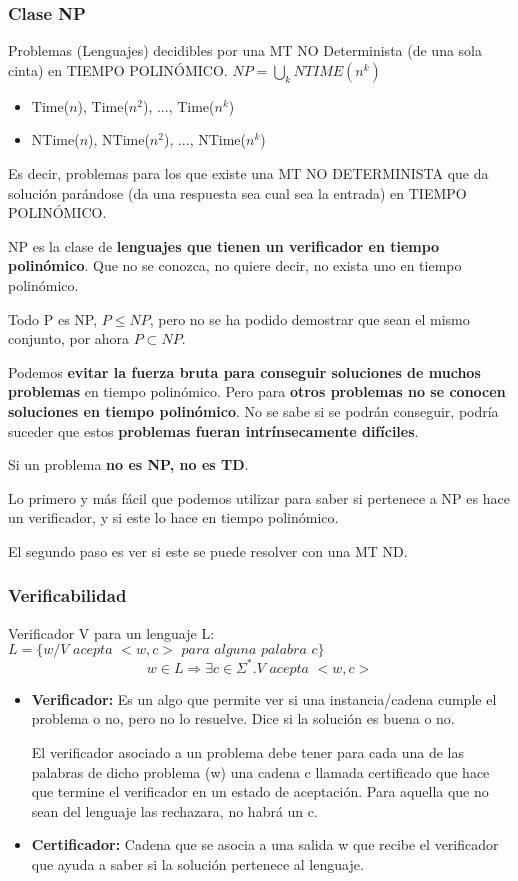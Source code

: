 \subsubsection{Clase NP}
Problemas (Lenguajes) decidibles por una MT NO Determinista (de una sola cinta) en TIEMPO POLINÓMICO. $NP= \bigcup_k NTIME(n^k)$
\begin{itemize}
	\item Time($n$), Time($n^2$), ..., Time($n^k$)
	\item NTime($n$), NTime($n^2$), ..., NTime($n^k$)
\end{itemize}

Es decir, problemas para los que existe una MT NO DETERMINISTA que da solución parándose (da una respuesta sea cual sea la entrada) en TIEMPO POLINÓMICO.

NP es la clase de \textbf{lenguajes que tienen un verificador en tiempo polinómico}. Que no se conozca, no quiere decir, no exista uno en tiempo polinómico.

Todo P es NP, $P \leq NP$, pero no se ha podido demostrar que sean el mismo conjunto, por ahora $P \subset NP$.

Podemos \textbf{evitar la fuerza bruta para conseguir soluciones de muchos problemas} en tiempo polinómico. Pero para \textbf{otros problemas no se conocen soluciones en tiempo polinómico}. No se sabe si se podrán conseguir, podría suceder que estos \textbf{problemas fueran intrínsecamente difíciles}.

Si un problema \textbf{no es NP, no es TD}.

Lo primero y más fácil que podemos utilizar para saber si pertenece a NP es hace un verificador, y si este lo hace en tiempo polinómico.

El segundo paso es ver si este se puede resolver con una MT ND.

\subsubsection{Verificabilidad}
Verificador V para un lenguaje L: $L=\{w / V \textit{ acepta } <w,c> \textit{ para alguna palabra }c\}$
$$w \in L \Rightarrow \exists c \in \Sigma^*. V \textit{ acepta } <w, c>$$
\begin{itemize}
	\item \textbf{Verificador:} Es un algo que permite ver si una instancia/cadena cumple el problema o no, pero no lo resuelve. Dice si la solución es buena o no.

	      El verificador asociado a un problema debe tener para cada una de las palabras de dicho problema (w) una cadena c llamada certificado que hace que termine el verificador en un estado de aceptación. Para aquella que no sean del lenguaje las rechazara, no habrá un c.
	\item \textbf{Certificador:} Cadena que se asocia a una salida w que recibe el verificador que ayuda a saber si la solución pertenece al lenguaje.
\end{itemize}

